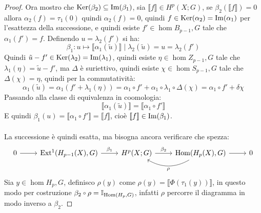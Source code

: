 \begin{proof}
  Ora mostro che $ \mathrm{Ker}( \beta_2) \subseteq \mathrm{Im}( \beta_1 ) $, sia
  $ \llbracket f \rrbracket \in H^p(X;G) $, se
  $ \beta_2(\llbracket f \rrbracket) = 0 $ allora $ \alpha_2(f) = \tau_1(0) $ quindi
  $ \alpha_2(f) = 0 $, quindi $ f \in \mathrm{Ker}( \alpha_2) = \mathrm{Im}( \alpha_1 ) $ per l'esattezza della
  successione, e quindi esiste $ f' \in \hom{B_{p-1}, G} $ tale che
  $ \alpha_1(f') = f $. Definendo $ u = \lambda_2(f') $ si ha:
  \[
    \beta_1 \colon u \mapsto \llbracket \alpha_1(\tilde{u}) \rrbracket \; | \; \lambda_2(\tilde{u}) = u = \lambda_2(f')
  \]
  Quindi $ \tilde{u} - f' \in \mathrm{Ker}( \lambda_2) = \mathrm{Im}( \lambda_1 ) $, quindi esiste $ \eta \in \hom{Z_{p-1}, G} $
  tale che $ \lambda_1(\eta) = \tilde{u} - f' $, ma $ \Delta $ è suriettivo, quindi esiste
  $ \chi \in \hom{S_{p-1},G} $ tale che $ \Delta(\chi) = \eta $, quindi per la commutatività:
  \[
    \alpha_1(\tilde{u}) = \alpha_1(f' + \lambda_1(\eta)) = \alpha_1 \circ f' + \alpha_1 \circ \lambda_1 \circ \Delta (\chi) = \alpha_1 \circ f' + \delta \chi
  \]
  Passando alla classe di equivalenza in coomologia:
  \[
    \llbracket \alpha_1(\tilde{u}) \rrbracket = \llbracket \alpha_1 \circ f' \rrbracket
  \]
  E quindi $ \beta_1(u) = \llbracket \alpha_1 \circ f' \rrbracket = \llbracket f \rrbracket $, cioè $ \llbracket f \rrbracket \in \mathrm{Im}( \beta_1 ) $.
  \\ \\ \noindent
  La successione è quindi esatta, ma bisogna ancora verificare che spezza:
  \[
    \begin{tikzcd}
      0 \rar & \ext{H_{p-1}(X), G} \rar{\beta_1} & H^p(X;G) \rar{\beta_2} & \hom{H_p(X), G} \rar \arrow[bend left]{l}{\rho} & 0
    \end{tikzcd}
  \]
  Sia $ y \in \hom{H_p, G} $, definisco $ \rho(y) $ come
  $ \rho(y) = \llbracket \Phi(\tau_1(y)) \rrbracket$, in questo modo per costruzione
  $ \beta_2 \circ \rho = \Id{\hom{H_p,G}} $, infatti $ \rho $ percorre
  il diagramma in modo inverso a $ \beta_2 $.
\end{proof}

